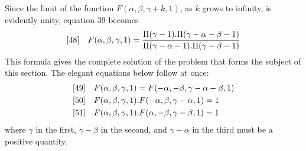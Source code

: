 Since the limit of the function $F(\alpha,\beta,\gamma+k,1)$, as $k$ grows to infinity, is evidently unity, equation 39 becomes
\[
\begin{array}{@{}ll@{}}
[48]&\displaystyle F(\alpha,\beta,\gamma,1)=
\frac{\Pi(\gamma-1).\Pi(\gamma-\alpha-\beta-1)}
{\Pi(\gamma-\alpha-1).\Pi(\gamma-\beta-1)}
\end{array}
\]
This formula gives the complete solution of the problem that forms the subject of this section. The elegant equations below follow at once:
\[
\begin{array}{@{}ll@{}}
[49]&\displaystyle F(\alpha,\beta,\gamma,1)=F(-\alpha,-\beta,\gamma-\alpha-\beta,1)\\[3pt]
[50]&\displaystyle F(\alpha,\beta,\gamma,1).F(-\alpha,\beta,\gamma-\alpha,1)=1\\[3pt]
[51]&\displaystyle F(\alpha,\beta,\gamma,1).F(\alpha,-\beta,\gamma-\beta,1)=1
\end{array}
\]
where $\gamma$ in the first, $\gamma-\beta$ in the second, and $\gamma-\alpha$ in the third must be a positive quantity.

